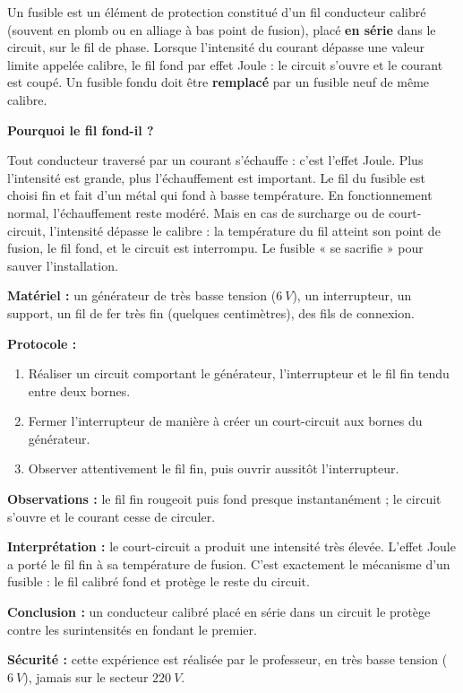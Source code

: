 \documentclass[11pt]{article}
\newcommand{\cle}[1]{{\popxbold\color{popdark}#1}}
\begin{document}
\begin{definition}[Le fusible]
Un \cle{fusible} est un élément de protection constitué d'un fil conducteur calibré (souvent en plomb ou en alliage à bas point de fusion), placé \textbf{en série} dans le circuit, sur le fil de phase. Lorsque l'intensité du courant dépasse une valeur limite appelée \cle{calibre}, le fil fond par \cle{effet Joule} : le circuit s'ouvre et le courant est coupé. Un fusible fondu doit être \textbf{remplacé} par un fusible neuf de même calibre.
\end{definition}

\textbf{Pourquoi le fil fond-il ?}\par
Tout conducteur traversé par un courant s'échauffe : c'est l'effet Joule. Plus l'intensité est grande, plus l'échauffement est important. Le fil du fusible est choisi fin et fait d'un métal qui fond à basse température. En fonctionnement normal, l'échauffement reste modéré. Mais en cas de surcharge ou de court-circuit, l'intensité dépasse le calibre : la température du fil atteint son point de fusion, le fil fond, et le circuit est interrompu. Le fusible « se sacrifie » pour sauver l'installation.

\begin{experience}
\textbf{Matériel :} un générateur de très basse tension ($\SI{6}{V}$), un interrupteur, un support, un fil de fer très fin (quelques centimètres), des fils de connexion.\par
\textbf{Protocole :}
\begin{enumerate}
\item Réaliser un circuit comportant le générateur, l'interrupteur et le fil fin tendu entre deux bornes.
\item Fermer l'interrupteur de manière à créer un court-circuit aux bornes du générateur.
\item Observer attentivement le fil fin, puis ouvrir aussitôt l'interrupteur.
\end{enumerate}
\textbf{Observations :} le fil fin rougeoit puis fond presque instantanément ; le circuit s'ouvre et le courant cesse de circuler.\par
\textbf{Interprétation :} le court-circuit a produit une intensité très élevée. L'effet Joule a porté le fil fin à sa température de fusion. C'est exactement le mécanisme d'un fusible : le fil calibré fond et protège le reste du circuit.\par
\textbf{Conclusion :} un conducteur calibré placé en série dans un circuit le protège contre les surintensités en fondant le premier.\par
\textbf{Sécurité :} cette expérience est réalisée par le professeur, en très basse tension ($\SI{6}{V}$), jamais sur le secteur $\SI{220}{V}$.
\end{experience}
\end{document}
